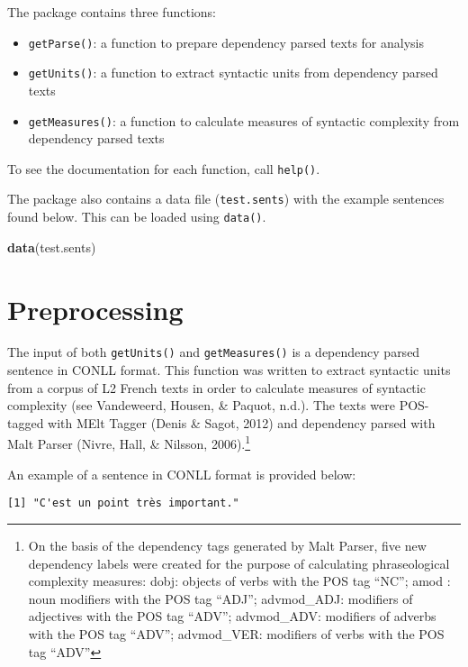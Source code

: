 \documentclass[
]{article}
\newenvironment{Shaded}{\begin{snugshade}}{\end{snugshade}}
\newcommand{\KeywordTok}[1]{\textcolor[rgb]{0.13,0.29,0.53}{\textbf{#1}}}
\newcommand{\NormalTok}[1]{#1}
\providecommand{\tightlist}{%
  \setlength{\itemsep}{0pt}\setlength{\parskip}{0pt}}
\begin{document}
The package contains three functions:

\begin{itemize}
\tightlist
\item
  \texttt{getParse()}: a function to prepare dependency parsed texts for
  analysis
\item
  \texttt{getUnits()}: a function to extract syntactic units from
  dependency parsed texts
\item
  \texttt{getMeasures()}: a function to calculate measures of syntactic
  complexity from dependency parsed texts
\end{itemize}

To see the documentation for each function, call \texttt{help()}.

The package also contains a data file (\texttt{test.sents}) with the
example sentences found below. This can be loaded using \texttt{data()}.

\begin{Shaded}
\begin{Highlighting}[]
\KeywordTok{data}\NormalTok{(test.sents)}
\end{Highlighting}
\end{Shaded}

\hypertarget{preprocessing}{%
\section{Preprocessing}\label{preprocessing}}

The input of both \texttt{getUnits()} and \texttt{getMeasures()} is a
dependency parsed sentence in CONLL format. This function was written to
extract syntactic units from a corpus of L2 French texts in order to
calculate measures of syntactic complexity (see Vandeweerd, Housen, \&
Paquot, n.d.). The texts were POS-tagged with MElt Tagger (Denis \&
Sagot, 2012) and dependency parsed with Malt Parser (Nivre, Hall, \&
Nilsson, 2006).\footnote{On the basis of the dependency tags generated
  by Malt Parser, five new dependency labels were created for the
  purpose of calculating phraseological complexity measures: dobj:
  objects of verbs with the POS tag ``NC''; amod : noun modifiers with
  the POS tag ``ADJ''; advmod\_ADJ: modifiers of adjectives with the POS
  tag ``ADV''; advmod\_ADV: modifiers of adverbs with the POS tag
  ``ADV''; advmod\_VER: modifiers of verbs with the POS tag ``ADV''}

An example of a sentence in CONLL format is provided below:

\begin{verbatim}
[1] "C'est un point très important."
\end{verbatim}
\end{document}
